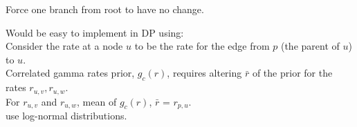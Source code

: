 \documentclass{llncs}
\begin{document}
Force one branch from root to have no change.


Would be easy to implement in DP using:\\
Consider the rate at a node $u$ to be the rate for the edge from $p$ (the parent of $u$) to $u$.\\
Correlated gamma rates prior, $g_c(r)$, requires altering $\bar{r}$ of the prior for the rates $r_{u,v}, r_{u,w}$.\\
For $r_{u,v}$ and $r_{u,w}$, mean of $g_c(r)$, $\bar{r}$ = $r_{p,u}$.\\
\cite{Kishino2001} use log-normal distributions.\\





\end{document}
